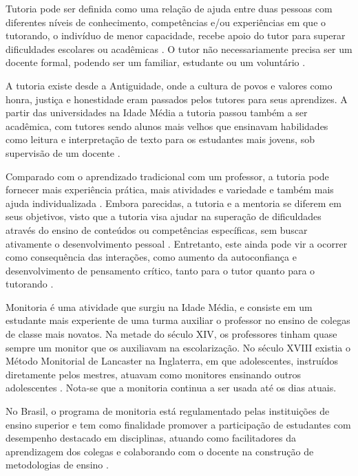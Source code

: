 Tutoria pode ser definida como uma relação de ajuda entre duas pessoas com diferentes níveis de conhecimento, competências e/ou experiências em que o tutorando, o indivíduo de menor capacidade, recebe apoio do tutor para superar dificuldades escolares ou acadêmicas \cite{opp2024mentoria}. O tutor não necessariamente precisa ser um docente formal, podendo ser um familiar, estudante ou um voluntário \cite{topping2000tutoring}.

A tutoria existe desde a Antiguidade, onde a cultura de povos e valores como honra, justiça e honestidade eram passados pelos tutores para seus aprendizes. A partir das universidades na Idade Média a tutoria passou também a ser acadêmica, com tutores sendo alunos mais velhos que ensinavam habilidades como leitura e interpretação de texto para os estudantes mais jovens, sob supervisão de um docente \cite{geib2007tutoria}.

Comparado com o aprendizado tradicional com um professor, a tutoria pode fornecer mais experiência prática, mais atividades e variedade e também mais ajuda individualizada \cite{topping2000tutoring}. Embora parecidas, a tutoria e a mentoria se diferem em seus objetivos, visto que a tutoria visa ajudar na superação de dificuldades através do ensino de conteúdos ou competências específicas, sem buscar ativamente o desenvolvimento pessoal \cite{opp2024mentoria}. Entretanto, este ainda pode vir a ocorrer como consequência das interações, como aumento da autoconfiança e desenvolvimento de pensamento crítico, tanto para o tutor quanto para o tutorando \cite{lin2025peer}.

Monitoria é uma atividade que surgiu na Idade Média, e consiste em um estudante mais experiente de uma turma auxiliar o professor no ensino de colegas de classe mais novatos. Na metade do século XIV, os professores tinham quase sempre um monitor que os auxiliavam na escolarização. No século XVIII existia o Método Monitorial de Lancaster na Inglaterra, em que adolescentes, instruídos diretamente pelos mestres, atuavam como monitores ensinando outros adolescentes \cite{frison2016monitoria}. Nota-se que a monitoria continua a ser usada até os dias atuais.

No Brasil, o programa de monitoria está regulamentado pelas instituições de ensino superior e tem como finalidade promover a participação de estudantes com desempenho destacado em disciplinas, atuando como facilitadores da aprendizagem dos colegas e colaborando com o docente na construção de metodologias de ensino \cite{monitoria2025}.

